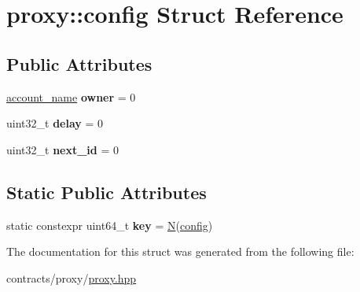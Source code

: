 \hypertarget{structproxy_1_1config}{}\section{proxy\+:\+:config Struct Reference}
\label{structproxy_1_1config}
\subsection*{Public Attributes}
\begin{DoxyCompactItemize}
\item 
\mbox{\label{structproxy_1_1config_a23e1f5c9482d7508502f321b9539a2c3}} 
\mbox{\hyperlink{structaacio_1_1chain_1_1name}{account\+\_\+name}} {\bfseries owner} = 0
\item 
\mbox{\label{structproxy_1_1config_a346536a60319e5666f7e037c77d4079b}} 
uint32\+\_\+t {\bfseries delay} = 0
\item 
\mbox{\label{structproxy_1_1config_a8391e0b1b68b42310bec80a0a0c7fe06}} 
uint32\+\_\+t {\bfseries next\+\_\+id} = 0
\end{DoxyCompactItemize}
\subsection*{Static Public Attributes}
\begin{DoxyCompactItemize}
\item 
\mbox{\label{structproxy_1_1config_abf3791398729e407fd465d25882ca466}} 
static constexpr uint64\+\_\+t {\bfseries key} = \mbox{\hyperlink{group__types_gaf9c1edb0e0da55ec6ba09f32f6839529}{N}}(\mbox{\hyperlink{structproxy_1_1config}{config}})
\end{DoxyCompactItemize}


The documentation for this struct was generated from the following file\+:\begin{DoxyCompactItemize}
\item 
contracts/proxy/\mbox{\hyperlink{proxy_8hpp}{proxy.\+hpp}}\end{DoxyCompactItemize}
